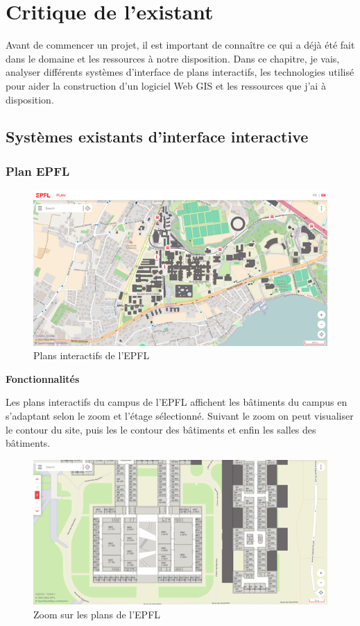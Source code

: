 \documentclass[
    iai, %
    il, %
]{heig-tb}
\begin{document}
\chapter{Critique de l'existant}
Avant de commencer un projet, il est important de connaître ce qui a déjà été fait dans le domaine et les ressources à notre disposition.
Dans ce chapitre, je vais, analyser différents systèmes d'interface de plans interactifs,
les technologies utilisé pour aider la construction d'un logiciel Web GIS et les ressources que j'ai à disposition.

\section{Systèmes existants d'interface interactive}

\subsection{Plan EPFL}
\begin{figure}[H]
    \caption{Plans interactifs de l'EPFL}
    \centering
    \includegraphics{planEPFL.png}
\end{figure}

\textbf{Fonctionnalités}

Les plans interactifs du campus de l'EPFL \cite{plan-epfl} affichent les bâtiments du campus en s'adaptant selon le zoom et l'étage sélectionné.
Suivant le zoom on peut visualiser le contour du site, puis les le contour des bâtiments et enfin les salles des bâtiments.

\begin{figure}[H]
    \caption{Zoom sur les plans de l'EPFL }
    \centering
    \includegraphics{planEPFLGrosPlan.png}
\end{figure}
\end{document}
